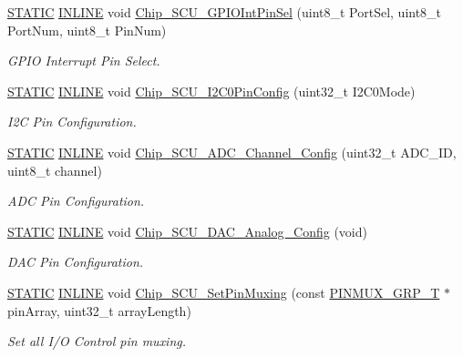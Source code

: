 \begin{DoxyCompactItemize}
\hyperlink{group___l_p_c___types___public___macros_ga10b2d890d871e1489bb02b7e70d9bdfb}{S\+T\+A\+T\+IC} \hyperlink{spifi__18xx__43xx_8h_a2eb6f9e0395b47b8d5e3eeae4fe0c116}{I\+N\+L\+I\+NE} void \hyperlink{group___s_c_u__18_x_x__43_x_x_gaa23b6f4d2f313a6c232e2ea3e7cd4786}{Chip\+\_\+\+S\+C\+U\+\_\+\+G\+P\+I\+O\+Int\+Pin\+Sel} (uint8\+\_\+t Port\+Sel, uint8\+\_\+t Port\+Num, uint8\+\_\+t Pin\+Num)
\begin{DoxyCompactList}\small\item\em G\+P\+IO Interrupt Pin Select. \end{DoxyCompactList}\item 
\hyperlink{group___l_p_c___types___public___macros_ga10b2d890d871e1489bb02b7e70d9bdfb}{S\+T\+A\+T\+IC} \hyperlink{spifi__18xx__43xx_8h_a2eb6f9e0395b47b8d5e3eeae4fe0c116}{I\+N\+L\+I\+NE} void \hyperlink{group___s_c_u__18_x_x__43_x_x_gad01225996749db1265c496568a29eaf8}{Chip\+\_\+\+S\+C\+U\+\_\+\+I2\+C0\+Pin\+Config} (uint32\+\_\+t I2\+C0\+Mode)
\begin{DoxyCompactList}\small\item\em I2C Pin Configuration. \end{DoxyCompactList}\item 
\hyperlink{group___l_p_c___types___public___macros_ga10b2d890d871e1489bb02b7e70d9bdfb}{S\+T\+A\+T\+IC} \hyperlink{spifi__18xx__43xx_8h_a2eb6f9e0395b47b8d5e3eeae4fe0c116}{I\+N\+L\+I\+NE} void \hyperlink{group___s_c_u__18_x_x__43_x_x_ga198684376606623332684569065a6d27}{Chip\+\_\+\+S\+C\+U\+\_\+\+A\+D\+C\+\_\+\+Channel\+\_\+\+Config} (uint32\+\_\+t A\+D\+C\+\_\+\+ID, uint8\+\_\+t channel)
\begin{DoxyCompactList}\small\item\em A\+DC Pin Configuration. \end{DoxyCompactList}\item 
\hyperlink{group___l_p_c___types___public___macros_ga10b2d890d871e1489bb02b7e70d9bdfb}{S\+T\+A\+T\+IC} \hyperlink{spifi__18xx__43xx_8h_a2eb6f9e0395b47b8d5e3eeae4fe0c116}{I\+N\+L\+I\+NE} void \hyperlink{group___s_c_u__18_x_x__43_x_x_ga5dd513d87e5d14f80544f59692536a92}{Chip\+\_\+\+S\+C\+U\+\_\+\+D\+A\+C\+\_\+\+Analog\+\_\+\+Config} (void)
\begin{DoxyCompactList}\small\item\em D\+AC Pin Configuration. \end{DoxyCompactList}\item 
\hyperlink{group___l_p_c___types___public___macros_ga10b2d890d871e1489bb02b7e70d9bdfb}{S\+T\+A\+T\+IC} \hyperlink{spifi__18xx__43xx_8h_a2eb6f9e0395b47b8d5e3eeae4fe0c116}{I\+N\+L\+I\+NE} void \hyperlink{group___s_c_u__18_x_x__43_x_x_ga118ccc4ab5b115c5e8c7ce457eb85536}{Chip\+\_\+\+S\+C\+U\+\_\+\+Set\+Pin\+Muxing} (const \hyperlink{struct_p_i_n_m_u_x___g_r_p___t}{P\+I\+N\+M\+U\+X\+\_\+\+G\+R\+P\+\_\+T} $\ast$pin\+Array, uint32\+\_\+t array\+Length)
\begin{DoxyCompactList}\small\item\em Set all I/O Control pin muxing. \end{DoxyCompactList}\end{DoxyCompactItemize}


